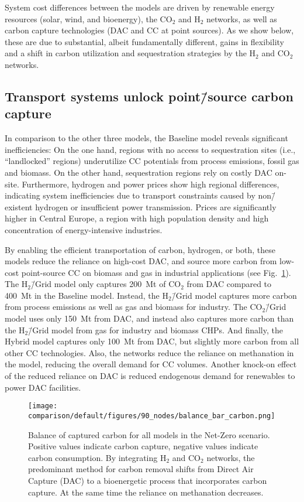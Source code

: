 \documentclass[twocolumn]{article}
\newcommand{\COtwo}{CO$_2$}
\newcommand{\Htwo}{H$_2$}
\newcommand{\modBase}{Baseline model}
\newcommand{\modCO}{CO$_2$\=/Grid model}
\newcommand{\modH}{H$_2$\=/Grid model}
\newcommand{\modHybrid}{Hybrid model}
\begin{document}
System cost differences between the models are driven by renewable energy resources (solar, wind, and bioenergy), the \COtwo{} and \Htwo{} networks, as well as carbon capture technologies (DAC and CC at point sources).
As we show below, these are due to substantial, albeit fundamentally different, gains in flexibility and a shift in carbon utilization and sequestration strategies by the \Htwo{} and \COtwo{} networks.

\subsection*{Transport systems unlock point\=/source carbon capture}

In comparison to the other three models, the \modBase{} reveals significant inefficiencies: On the one hand, regions with no access to sequestration sites (i.e., ``landlocked'' regions) underutilize CC potentials from process emissions, fossil gas and biomass. On the other hand, sequestration regions rely on costly DAC on-site. Furthermore, hydrogen and power prices show high regional differences, indicating system inefficiencies due to transport constraints caused by non\=/existent hydrogen or insufficient power transmission. Prices are significantly higher in Central Europe, a region with high population density and high concentration of energy-intensive industries.

By enabling the efficient transportation of carbon, hydrogen, or both, these models reduce the reliance on high-cost DAC, and source more carbon from low-cost point-source CC on biomass and gas in industrial applications (see Fig.~\ref{fig:balance_captured_carbon}). The \modH{} only captures \label{}200~Mt of \COtwo{} from DAC compared to \label{}400~Mt in the \modBase{}. Instead, the \modH{} captures more carbon from process emissions as well as gas and biomass for industry. The \modCO{} uses only \label{}150~Mt from DAC, and instead also captures more carbon than the \modH{} from gas for industry and biomass CHPs. And finally, the \modHybrid{} captures only \label{}100~Mt from DAC, but slightly more carbon from all other CC technologies.
Also, the networks reduce the reliance on methanation in the model, reducing the overall demand for CC volumes. Another knock-on effect of the reduced reliance on DAC is reduced endogenous demand for renewables to power DAC facilities.

\begin{figure}[ht!]
    \centering
    \texttt{[image: comparison/default/figures/90\_nodes/balance\_bar\_carbon.png]}
    \caption{Balance of captured carbon for all models in the Net-Zero scenario. Positive values indicate carbon capture, negative values indicate carbon consumption. By integrating \Htwo{} and \COtwo{} networks, the predominant method for carbon removal shifts from Direct Air Capture (DAC) to a bioenergetic process that incorporates carbon capture. At the same time the reliance on methanation decreases.}
    \label{fig:balance_captured_carbon}
\end{figure}
\end{document}

